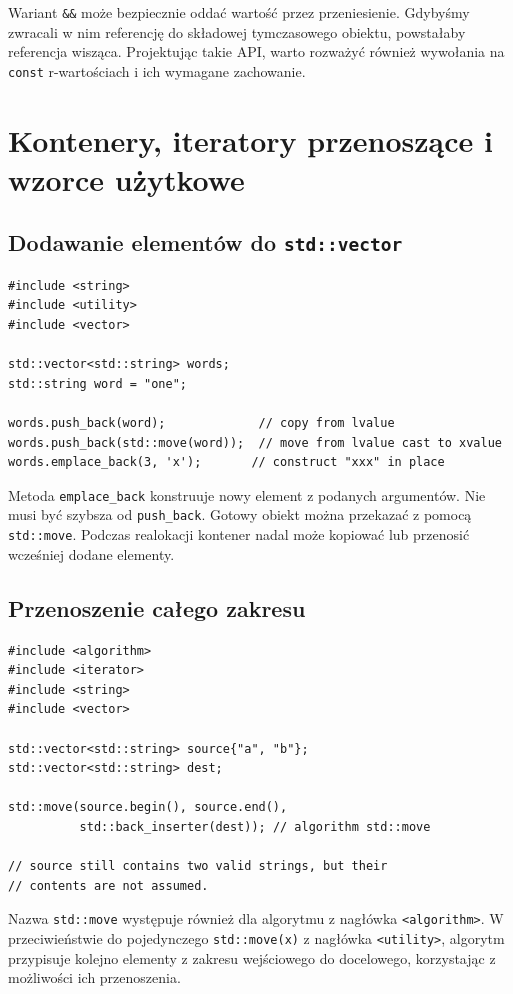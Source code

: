 Wariant \texttt{\&\&} może bezpiecznie oddać wartość przez
przeniesienie. Gdybyśmy zwracali w nim referencję do składowej
tymczasowego obiektu, powstałaby referencja wisząca.
Projektując takie API, warto rozważyć również wywołania na
\texttt{const} r-wartościach i ich wymagane zachowanie.

\section{Kontenery, iteratory przenoszące i wzorce użytkowe}

\subsection{Dodawanie elementów do \texttt{std::vector}}

\begin{lstlisting}
#include <string>
#include <utility>
#include <vector>

std::vector<std::string> words;
std::string word = "one";

words.push_back(word);             // copy from lvalue
words.push_back(std::move(word));  // move from lvalue cast to xvalue
words.emplace_back(3, 'x');       // construct "xxx" in place
\end{lstlisting}

Metoda \texttt{emplace\_back} konstruuje nowy element z podanych
argumentów. Nie musi być szybsza od \texttt{push\_back}.
Gotowy obiekt można przekazać z pomocą \texttt{std::move}.
Podczas realokacji kontener nadal może kopiować lub przenosić
wcześniej dodane elementy.

\subsection{Przenoszenie całego zakresu}

\begin{lstlisting}
#include <algorithm>
#include <iterator>
#include <string>
#include <vector>

std::vector<std::string> source{"a", "b"};
std::vector<std::string> dest;

std::move(source.begin(), source.end(),
          std::back_inserter(dest)); // algorithm std::move

// source still contains two valid strings, but their
// contents are not assumed.
\end{lstlisting}

Nazwa \texttt{std::move} występuje również dla algorytmu z nagłówka
\texttt{<algorithm>}. W przeciwieństwie do pojedynczego
\texttt{std::move(x)} z nagłówka \texttt{<utility>}, algorytm
przypisuje kolejno elementy z zakresu wejściowego do docelowego, korzystając
z możliwości ich przenoszenia.

